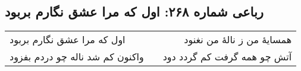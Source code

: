 \begin{center}
\section*{رباعی شماره ۲۶۸: اول که مرا عشق نگارم بربود}
\label{sec:sh268}
\begin{longtable}{l p{0.5cm} r}
اول که مرا عشق نگارم بربود
&&
همسایهٔ من ز نالهٔ من نغنود
\\
واکنون کم شد ناله چو دردم بفزود
&&
آتش چو همه گرفت کم گردد دود
\\
\end{longtable}
\end{center}
